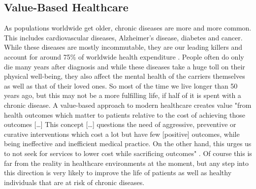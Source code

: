 \subsection{Value-Based Healthcare}
\label{sec:valueBasedHealthcare}
As populations worldwide get older, chronic diseases are more and more common. This includes cardiovascular diseases, Alzheimer's disease, diabetes and cancer. While these diseases are mostly incommutable, they are our leading killers and account for around 75\% of worldwide health expenditure \cite{tsiachristas2016financial}. People often do only die many years after diagnosis and while these diseases take a huge toll on their physical well-being, they also affect the mental health of the carriers themselves as well as that of their loved ones. So most of the time we live longer than 50 years ago, but this may not be a more fulfilling life, if half of it is spent with a chronic disease. A value-based approach to modern healthcare creates value "from health outcomes which matter to patients relative to the cost of achieving those outcomes [\dots] This concept [\dots] questions the need of aggressive, preventive or curative interventions which cost a lot but have few [positive] outcomes, while being ineffective and inefficient medical practice. On the other hand, this urges us to not seek for services to lower cost while sacrificing outcomes" \cite{putera2017redefining}. Of course this is far from the reality in healthcare environments at the moment, but any step into this direction is very likely to improve the life of patients as well as healthy individuals that are at risk of chronic diseases.
